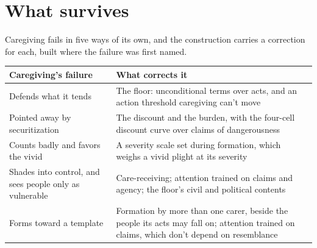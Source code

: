 \section{What survives}
\label{sec:20.12}
Caregiving fails in five ways of its own, and the construction carries a correction for each, built where the failure was first named.

\begingroup\small\renewcommand{\arraystretch}{1.12}
\begin{longtable}{@{}>{\raggedright\arraybackslash}p{}>{\raggedright\arraybackslash}p{}@{}}
\hline
\textbf{Caregiving's failure} & \textbf{What corrects it} \\
\hline
\endhead
Defends what it tends & The floor: unconditional terms over acts, and an action threshold caregiving can't move \\ \hline
Pointed away by securitization & The discount and the burden, with the four-cell discount curve over claims of dangerousness \\ \hline
Counts badly and favors the vivid & A severity scale set during formation, which weighs a vivid plight at its severity \\ \hline
Shades into control, and sees people only as vulnerable & Care-receiving; attention trained on claims and agency; the floor's civil and political contents \\ \hline
Forms toward a template & Formation by more than one carer, beside the people its acts may fall on; attention trained on claims, which don't depend on resemblance \\ \hline
\end{longtable}
\endgroup

